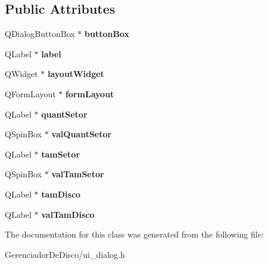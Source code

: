 \subsection*{Public Attributes}
\begin{DoxyCompactItemize}
\item 
\hypertarget{classUi__Dialog_a271a59402f80983c2722bb455db37365}{Q\+Dialog\+Button\+Box $\ast$ {\bfseries button\+Box}}\label{classUi__Dialog_a271a59402f80983c2722bb455db37365}

\item 
\hypertarget{classUi__Dialog_ac3844fd0281707dc5535826da7506ca5}{Q\+Label $\ast$ {\bfseries label}}\label{classUi__Dialog_ac3844fd0281707dc5535826da7506ca5}

\item 
\hypertarget{classUi__Dialog_aeb2e76ae84a3a2c7943003b31fab3807}{Q\+Widget $\ast$ {\bfseries layout\+Widget}}\label{classUi__Dialog_aeb2e76ae84a3a2c7943003b31fab3807}

\item 
\hypertarget{classUi__Dialog_ad9cfb27ad75b6ac3776d697f97825b71}{Q\+Form\+Layout $\ast$ {\bfseries form\+Layout}}\label{classUi__Dialog_ad9cfb27ad75b6ac3776d697f97825b71}

\item 
\hypertarget{classUi__Dialog_a2007836cd3a70e87f2a6f44f1a8126c1}{Q\+Label $\ast$ {\bfseries quant\+Setor}}\label{classUi__Dialog_a2007836cd3a70e87f2a6f44f1a8126c1}

\item 
\hypertarget{classUi__Dialog_a8fcca9006bc63d1d030bffb5b9e92ec8}{Q\+Spin\+Box $\ast$ {\bfseries val\+Quant\+Setor}}\label{classUi__Dialog_a8fcca9006bc63d1d030bffb5b9e92ec8}

\item 
\hypertarget{classUi__Dialog_ac0b324ec24e0c91a7974b9abc3a83507}{Q\+Label $\ast$ {\bfseries tam\+Setor}}\label{classUi__Dialog_ac0b324ec24e0c91a7974b9abc3a83507}

\item 
\hypertarget{classUi__Dialog_a6ba8924aa1dd286a7c6dfc6ec84a219c}{Q\+Spin\+Box $\ast$ {\bfseries val\+Tam\+Setor}}\label{classUi__Dialog_a6ba8924aa1dd286a7c6dfc6ec84a219c}

\item 
\hypertarget{classUi__Dialog_aeab04565d67cbc0f007fbfa288354c0c}{Q\+Label $\ast$ {\bfseries tam\+Disco}}\label{classUi__Dialog_aeab04565d67cbc0f007fbfa288354c0c}

\item 
\hypertarget{classUi__Dialog_a55abf6ad25c300be730eca4f5851267d}{Q\+Label $\ast$ {\bfseries val\+Tam\+Disco}}\label{classUi__Dialog_a55abf6ad25c300be730eca4f5851267d}

\end{DoxyCompactItemize}


The documentation for this class was generated from the following file\+:\begin{DoxyCompactItemize}
\item 
Gerenciador\+De\+Disco/ui\+\_\+dialog.\+h\end{DoxyCompactItemize}
